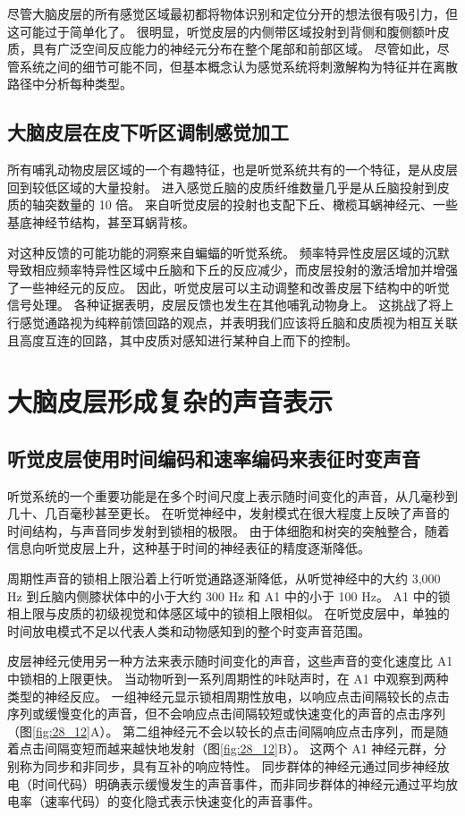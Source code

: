 尽管大脑皮层的所有感觉区域最初都将物体识别和定位分开的想法很有吸引力，但这可能过于简单化了。 很明显，听觉皮层的内侧带区域投射到背侧和腹侧额叶皮质，具有广泛空间反应能力的神经元分布在整个尾部和前部区域。 尽管如此，尽管系统之间的细节可能不同，但基本概念认为感觉系统将刺激解构为特征并在离散路径中分析每种类型。


\subsection{大脑皮层在皮下听区调制感觉加工}
所有哺乳动物皮层区域的一个有趣特征，也是听觉系统共有的一个特征，是从皮层回到较低区域的大量投射。 进入感觉丘脑的皮质纤维数量几乎是从丘脑投射到皮质的轴突数量的 10 倍。 来自听觉皮层的投射也支配下丘、橄榄耳蜗神经元、一些基底神经节结构，甚至耳蜗背核。

对这种反馈的可能功能的洞察来自蝙蝠的听觉系统。 频率特异性皮层区域的沉默导致相应频率特异性区域中丘脑和下丘的反应减少，而皮层投射的激活增加并增强了一些神经元的反应。 因此，听觉皮层可以主动调整和改善皮层下结构中的听觉信号处理。 各种证据表明，皮层反馈也发生在其他哺乳动物身上。 这挑战了将上行感觉通路视为纯粹前馈回路的观点，并表明我们应该将丘脑和皮质视为相互关联且高度互连的回路，其中皮质对感知进行某种自上而下的控制。


\section{大脑皮层形成复杂的声音表示}


\subsection{听觉皮层使用时间编码和速率编码来表征时变声音}
听觉系统的一个重要功能是在多个时间尺度上表示随时间变化的声音，从几毫秒到几十、几百毫秒甚至更长。 
在听觉神经中，发射模式在很大程度上反映了声音的时间结构，与声音同步发射到锁相的极限。 
由于体细胞和树突的突触整合，随着信息向听觉皮层上升，这种基于时间的神经表征的精度逐渐降低。

周期性声音的锁相上限沿着上行听觉通路逐渐降低，从听觉神经中的大约 3,000 Hz 到丘脑内侧膝状体中的小于大约 300 Hz 和 A1 中的小于 100 Hz。 
A1 中的锁相上限与皮质的初级视觉和体感区域中的锁相上限相似。 
在听觉皮层中，单独的时间放电模式不足以代表人类和动物感知到的整个时变声音范围。

皮层神经元使用另一种方法来表示随时间变化的声音，这些声音的变化速度比 A1 中锁相的上限更快。 
当动物听到一系列周期性的咔哒声时，在 A1 中观察到两种类型的神经反应。 
一组神经元显示锁相周期性放电，以响应点击间隔较长的点击序列或缓慢变化的声音，但不会响应点击间隔较短或快速变化的声音的点击序列（图\ref{fig:28_12}A）。 
第二组神经元不会以较长的点击间隔响应点击序列，而是随着点击间隔变短而越来越快地发射（图\ref{fig:28_12}B）。 
这两个 A1 神经元群，分别称为同步和非同步，具有互补的响应特性。 
同步群体的神经元通过同步神经放电（时间代码）明确表示缓慢发生的声音事件，而非同步群体的神经元通过平均放电率（速率代码）的变化隐式表示快速变化的声音事件。

